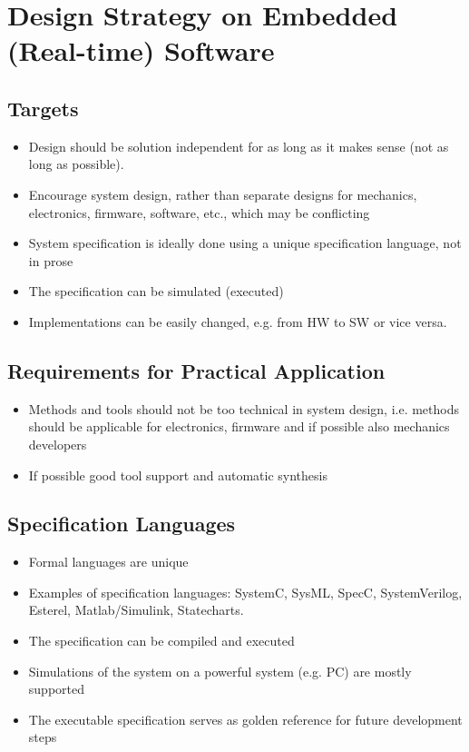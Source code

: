 \section[Design Strategy]{Design Strategy on Embedded (Real-time) Software}
\subsection{Targets}
\begin{itemize}
	\item Design should be solution independent for as long as it makes sense (not as long as possible).
	\item Encourage system design, rather than separate designs for mechanics, electronics, firmware, software, etc., which may be conflicting
	\item System specification is ideally done using a unique specification language, not in prose
	\item The specification can be simulated (executed)
	\item Implementations can be easily changed, e.g. from HW to SW or vice versa.
\end{itemize}

\subsection{Requirements for Practical Application}
\begin{itemize}
	\item Methods and tools should not be too technical in system design, i.e. methods should be applicable for electronics, firmware and if possible also mechanics developers
	\item If possible good tool support and automatic synthesis
\end{itemize}

\subsection{Specification Languages}
\begin{itemize}
	\item Formal languages are unique
	\item Examples of specification languages: SystemC, SysML, SpecC, SystemVerilog, Esterel, Matlab/Simulink, Statecharts.
	\item The specification can be compiled and executed
	\item Simulations of the system on a powerful system (e.g. PC) are mostly supported
	\item The executable specification serves as golden reference for future development steps
\end{itemize}

